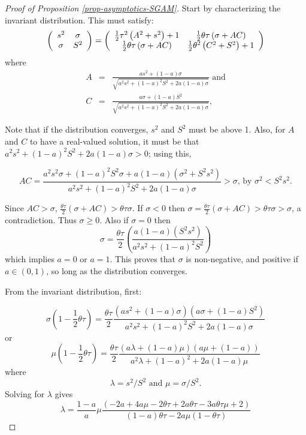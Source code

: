 \documentclass[
]{article}
\theoremstyle{definition}
\theoremstyle{definition}
\theoremstyle{definition}
\theoremstyle{definition}
\theoremstyle{remark}
\begin{document}
\begin{proof}[Proof of Proposition \ref{prop-asymptotics-SGAM}]
Start by characterizing the invariant distribution. This must satisfy:%
\[
\left( 
\begin{array}{cc}
s^{2} & \sigma \\ 
\sigma & S^{2}%
\end{array}%
\right) =\left( 
\begin{array}{cc}
\frac{1}{2}\tau ^{2}\left( A^{2}+s^{2}\right) +1 & \frac{1}{2}%
\theta \tau \left( \sigma+AC\right)  \\ 
\frac{1}{2}\theta \tau \left( \sigma+AC\right)  & \frac{1}{%
2}\theta ^{2}\left( C^{2}+S^{2}\right) +1%
\end{array}%
\right) \allowbreak 
\]%
where%
\begin{eqnarray*}
A &=&\frac{as^{2}+\left( 1-a\right) \sigma}{\sqrt{a^{2}%
s^{2}+\left( 1-a\right) ^{2}S^{2}+2a\left( 1-a\right) \sigma%
}}\textrm{ \ and} \\
C &=&\frac{a\sigma+\left( 1-a\right) S^{2}}{\sqrt{a^{2}%
s^{2}+\left( 1-a\right) ^{2}S^{2}+2a\left( 1-a\right) \sigma%
}},
\end{eqnarray*}%

Note that if the distribution converges, $s^{2}$ and $S^{2}$
must be above 1. Also, for $A$ and $C$ to have a real-valued
solution, it must be that $a^{2}s^{2}+(1-a)^{2}S^{2}+2a(1-a)\sigma>0$;
using this,

\[
AC=\frac{a^{2}s^{2}\sigma+(1-a)^{2}S^{2}\sigma+a(1-a)(\sigma^{2}+S^{2}s^{2})}{a^{2}s^{2}+(1-a)^{2}S^{2}+2a(1-a)\sigma}>\sigma\textrm{, by }\sigma^{2}<S^{2}s^{2}.
\]

Since $AC>\sigma$, $\frac{\theta\tau}{2}(\sigma+AC)>\theta\tau\sigma$.
If $\sigma<0$ then $\sigma=\frac{\theta\tau}{2}(\sigma+AC)>\theta\tau\sigma>\sigma$,
a contradiction. Thus $\sigma\ge0$. Also if $\sigma=0$
then 
\[
\sigma=\frac{\theta\tau}{2}\left(\frac{a(1-a)(S^{2}s^{2})}{a^{2}s^{2}+(1-a)^{2}S^{2}}\right)
\]
which implies $a=0$ or $a=1$. This proves that $\sigma$ is
non-negative, and positive if $a\in(0,1)$, so long as the distribution
converges.

From the invariant distribution, first:

\[
\sigma\left(1-\frac{1}{2}\theta\tau\right)=\frac{\theta\tau}{2}\frac{\left(as^{2}+\left(1-a\right)\sigma\right)\left(a\sigma+\left(1-a\right)S^{2}\right)}{a^{2}s^{2}+\left(1-a\right)^{2}S^{2}+2a\left(1-a\right)\sigma}
\]
or
\[
\mu\left(1-\frac{1}{2}\theta\tau\right)=\frac{\theta\tau}{2}\frac{\left(a\lambda+\left(1-a\right)\mu\right)\left(a\mu+\left(1-a\right)\right)}{a^{2}\lambda+\left(1-a\right)^{2}+2a\left(1-a\right)\mu}
\]
where
\[
\lambda=s^{2}/S^{2}\text{ and }\mu=\sigma/S^{2}.
\]
Solving for $\lambda$ gives
\begin{equation}
\lambda=\frac{1-a}{a}\mu\frac{\left(-2a+4a\mu-2\theta\tau+2a\theta\tau-3a\theta\tau\mu+2\right)\allowbreak}{\left(1-a\right)\theta\tau-2a\mu\left(1-\theta\tau\right)}\label{L}
\end{equation}


\end{proof}
\end{document}
